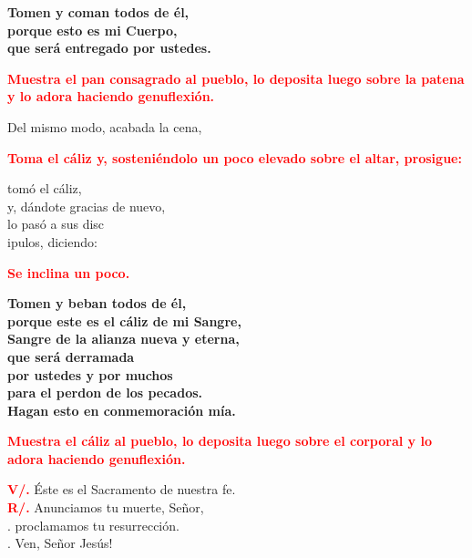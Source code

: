 \documentclass[12pt, letterpaper, spanish]{report}
\begin{document}
\LARGE{ \bfseries{ Tomen y coman todos de \'el,\\
porque esto es mi Cuerpo,\\
que ser\'a entregado por ustedes.}}\newline

\large{\bfseries \textcolor{red}{Muestra el pan consagrado al pueblo, lo deposita luego sobre la patena y lo adora haciendo genuflexi\'on.}}\newline

\Large Del mismo modo, acabada la cena,\newline

\large{\bfseries \textcolor{red}{Toma el c\'aliz y, sosteni\'endolo un poco elevado sobre el altar, prosigue:}}\newline

\Large tom\'o el c\'aliz,\\
y, d\'andote gracias de nuevo,\\
lo pas\'o a sus disc\\ipulos, diciendo:\newline

\large{\bfseries \textcolor{red}{Se inclina un poco.}}\newline

\LARGE{ \bfseries{ Tomen y beban todos de \'el,\\
porque este es el c\'aliz de mi Sangre,\\
Sangre de la alianza nueva y eterna,\\
que ser\'a derramada\\ 
por ustedes y por muchos\\
para el perdon de los pecados.\\
Hagan esto en conmemoraci\'on m\'ia.}}\newline

\large{\bfseries \textcolor{red}{Muestra el c\'aliz al pueblo, lo deposita luego sobre el corporal y lo adora haciendo genuflexi\'on.}}\newline

\Large \hspace{-0.9cm} {\bfseries \textcolor{red}{V/.}} \hspace{0.5cm} \'Este es el Sacramento de nuestra fe.\\
\Large \hspace{-0.9cm} {\bfseries \textcolor{red}{R/.}} \hspace{0.5cm} Anunciamos tu muerte, Se\~nor,\\
.\hspace{1.5cm} proclamamos tu resurrecci\'on.\\
.\hspace{1.5cm} Ven, Se\~nor Jes\'us!\newline
\end{document}
